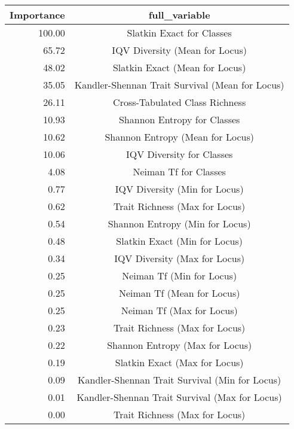 \begin{tabular}{|r|c|}
  \hline
Importance & full\_variable \\ 
  \hline
100.00 & Slatkin Exact for Classes \\ 
  65.72 & IQV Diversity (Mean for Locus) \\ 
  48.02 & Slatkin Exact (Mean for Locus) \\ 
  35.05 & Kandler-Shennan Trait Survival (Mean for Locus) \\ 
  26.11 & Cross-Tabulated Class Richness \\ 
  10.93 & Shannon Entropy for Classes \\ 
  10.62 & Shannon Entropy (Mean for Locus) \\ 
  10.06 & IQV Diversity for Classes \\ 
  4.08 & Neiman Tf for Classes \\ 
  0.77 & IQV Diversity (Min for Locus) \\ 
  0.62 & Trait Richness (Max for Locus) \\ 
  0.54 & Shannon Entropy (Min for Locus) \\ 
  0.48 & Slatkin Exact (Min for Locus) \\ 
  0.34 & IQV Diversity (Max for Locus) \\ 
  0.25 & Neiman Tf (Min for Locus) \\ 
  0.25 & Neiman Tf (Mean for Locus) \\ 
  0.25 & Neiman Tf (Max for Locus) \\ 
  0.23 & Trait Richness (Max for Locus) \\ 
  0.22 & Shannon Entropy (Max for Locus) \\ 
  0.19 & Slatkin Exact (Max for Locus) \\ 
  0.09 & Kandler-Shennan Trait Survival (Min for Locus) \\ 
  0.01 & Kandler-Shennan Trait Survival (Max for Locus) \\ 
  0.00 & Trait Richness (Max for Locus) \\ 
   \hline
\end{tabular}
